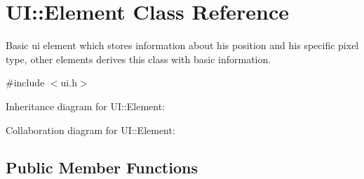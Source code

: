 \hypertarget{classUI_1_1Element}{}\section{UI\+:\+:Element Class Reference}
\label{classUI_1_1Element}


Basic ui element which stores information about his position and his specific pixel type, other elements derives this class with basic information.  




{\ttfamily \#include $<$ui.\+h$>$}



Inheritance diagram for UI\+:\+:Element\+:


Collaboration diagram for UI\+:\+:Element\+:
\subsection*{Public Member Functions}
